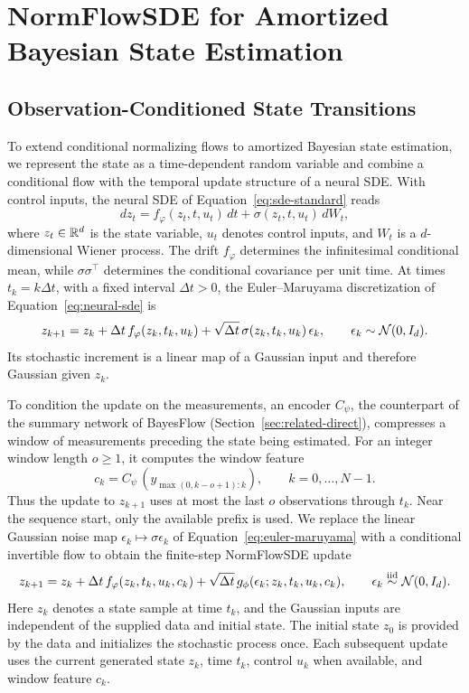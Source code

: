 \section{NormFlowSDE for Amortized Bayesian State Estimation}\label{sec:method}

\subsection{Observation-Conditioned State Transitions}

To extend conditional normalizing flows to amortized Bayesian state estimation, we represent the state as a time-dependent random variable and combine a conditional flow with the temporal update structure of a neural SDE. With control inputs, the neural SDE of Equation~\eqref{eq:sde-standard} reads
\begin{equation}\label{eq:neural-sde}
 dz_t=f_\varphi(z_t,t,u_t)\,dt+\sigma(z_t,t,u_t)\,dW_t,
\end{equation}
where $z_t\in\mathbb R^d$ is the state variable, $u_t$ denotes control inputs, and $W_t$ is a $d$-dimensional Wiener process. The drift $f_\varphi$ determines the infinitesimal conditional mean, while $\sigma\sigma^\top$ determines the conditional covariance per unit time. At times $t_k=k\Delta t$, with a fixed interval $\Delta t>0$, the Euler--Maruyama discretization of Equation~\eqref{eq:neural-sde} is
\begin{equation}\label{eq:euler-maruyama}
 z_{k+1}=z_k+\Delta t\,f_\varphi(z_k,t_k,u_k)+\sqrt{\Delta t}\,\sigma(z_k,t_k,u_k)\,\epsilon_k,
 \qquad \epsilon_k\sim\mathcal N(0,I_d).
\end{equation}
Its stochastic increment is a linear map of a Gaussian input and therefore Gaussian given $z_k$.

To condition the update on the measurements, an encoder $C_\psi$, the counterpart of the summary network of BayesFlow (Section~\ref{sec:related-direct}), compresses a window of measurements preceding the state being estimated. For an integer window length $o\geq1$, it computes the window feature
\begin{equation}\label{eq:sequence-conditioning}
 c_k=C_\psi\,\left(y_{\max(0,k-o+1):k}\right),
 \qquad k=0,\ldots,N-1.
\end{equation}
Thus the update to $z_{k+1}$ uses at most the last $o$ observations through $t_k$. Near the sequence start, only the available prefix is used. We replace the linear Gaussian noise map $\epsilon_k\mapsto\sigma\epsilon_k$ of Equation~\eqref{eq:euler-maruyama} with a conditional invertible flow to obtain the finite-step NormFlowSDE update
\begin{equation}\label{eq:normflowsde-overview}
 z_{k+1}=z_k+\Delta t\,f_\varphi(z_k,t_k,u_k,c_k)
          +\sqrt {\Delta t}\,g_\phi(\epsilon_k;z_k,t_k,u_k,c_k),
 \qquad \epsilon_k\stackrel{\mathrm{iid}}\sim\mathcal N(0,I_d).
\end{equation}
Here $z_k$ denotes a state sample at time $t_k$, and the Gaussian inputs are independent of the supplied data and initial state. The initial state $z_0$ is provided by the data and initializes the stochastic process once. Each subsequent update uses the current generated state $z_k$, time $t_k$, control $u_k$ when available, and window feature $c_k$.

